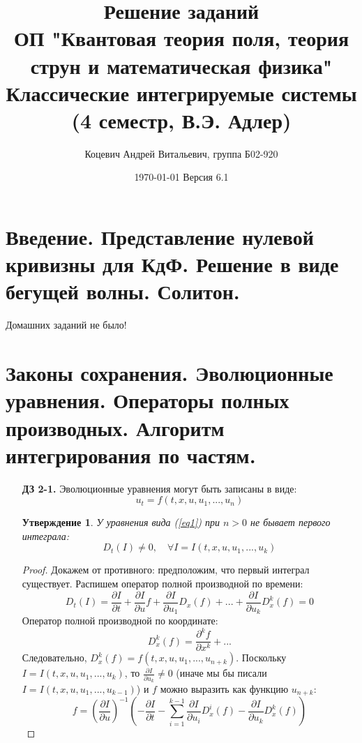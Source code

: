 \documentclass[12pt]{article}
\title{Решение заданий\\ ОП "Квантовая теория поля, теория струн и математическая физика"\\[2cm]
Классические интегрируемые системы\\
(4 семестр, В.Э. Адлер)}
\author{Коцевич Андрей Витальевич, группа Б02-920}
\date{\today\; Версия 6.1}
\newtheorem{utv}{Утверждение}
\theoremstyle{definition}
\begin{document}
\maketitle
\newpage
\newpage
\tableofcontents{}
\newpage
\section{Введение. Представление нулевой кривизны для КдФ. Решение в виде бегущей волны. Солитон.}
Домашних заданий не было!
\section{Законы сохранения. Эволюционные уравнения. Операторы полных производных. Алгоритм интегрирования по частям.}
\begin{itemize}
    \item[\textbf{ДЗ 2-1.}]
    Эволюционные уравнения могут быть записаны в виде:
    \begin{equation}\label{eq1}
        u_t=f(t,x,u,u_1,...,u_n)
    \end{equation}
    \begin{utv}
    У уравнения вида (\ref{eq1}) при $n>0$ не бывает первого интеграла:
    \begin{equation}
        D_t(I)\neq 0,\quad \forall I=I(t,x,u,u_1,...,u_k)
    \end{equation}
    \end{utv}
    \begin{proof}
    Докажем от противного: предположим, что первый интеграл существует. Распишем оператор полной производной по времени:
    \begin{equation}
        D_t(I)=\frac{\partial I}{\partial t}+\frac{\partial I}{\partial u}f+\frac{\partial I}{\partial u_1}D_x(f)+...+\frac{\partial I}{\partial u_k}D^k_x(f)=0
    \end{equation}
    Оператор полной производной по координате:
    \begin{equation}
        D_x^k(f)=\frac{\partial^k f}{\partial x^k}+...
    \end{equation}
    Следовательно, $D_x^k(f)=f(t,x,u,u_1,...,u_{n+k})$. Поскольку $I=I(t,x,u,u_1,...,u_k)$, то $\frac{\partial I}{\partial u_k}\neq 0$ (иначе мы бы писали $I=I(t,x,u,u_1,...,u_{k-1})$) и $f$ можно выразить как функцию $u_{n+k}$:
    \begin{equation}\label{eq2}
        f=\left(\frac{\partial I}{\partial u}\right)^{-1}\left(-\frac{\partial I}{\partial t}-\sum\limits_{i=1}^{k-1} \frac{\partial I}{\partial u_i}D_x^i(f)-\frac{\partial I}{\partial u_k}D_x^k(f)\right)

\end{equation}
\end{proof}
\end{itemize}
\end{document}
